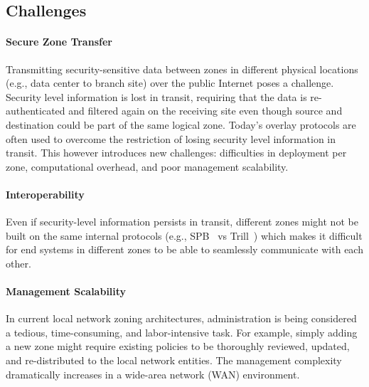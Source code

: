\subsection{Challenges}
\label{ssec:challenges}

\paragraph{Secure Zone Transfer}
Transmitting security-sensitive data between zones in different physical locations (e.g., 
data center to branch site) over the public Internet poses a challenge. 
Security level information is lost in transit, requiring that the data is re-authenticated and 
filtered again on the receiving site even though source and destination could be part of the 
same logical zone.
Today's overlay protocols are often used to overcome the restriction of losing 
security level information in transit. This however introduces new challenges: difficulties 
in deployment per zone, computational overhead, and poor management scalability. 

\paragraph{Interoperability}
Even if security-level information persists in transit, different zones might not be 
built on the same internal protocols (e.g., SPB~\cite{ieee2012spb} vs Trill~\cite{rfc6325}) 
which makes it difficult
for end systems in different zones to be able to seamlessly communicate with each other.

\paragraph{Management Scalability}
In current local network zoning architectures, administration is being considered a tedious, 
time-consuming, and labor-intensive task. For example, simply adding a new zone might
require existing policies to be thoroughly reviewed, updated, and re-distributed
to the local network entities. The management complexity dramatically increases in a 
wide-area network (WAN) environment.


